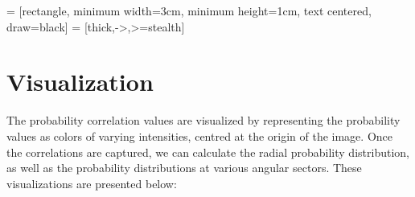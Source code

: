 \documentclass[12pt, a4paper]{report}
\begin{document}
\usetikzlibrary{shapes.geometric, arrows}
 = [rectangle, minimum width=3cm, minimum height=1cm, text centered, draw=black]
 = [thick,->,>=stealth]
\begin{center}
\end{center}

\section{Visualization}
The probability correlation values are visualized by representing the probability values as colors of varying intensities, centred at the origin of the image. Once the correlations are captured, we can calculate the radial probability distribution, as well as the probability distributions at various angular sectors. These visualizations are presented below:
\end{document}
